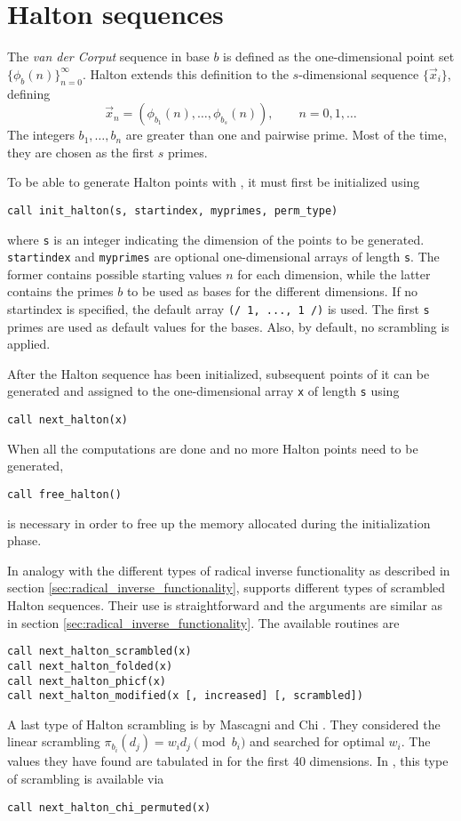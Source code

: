 \section{Halton sequences}

The \emph{van der Corput} sequence in base $b$ is defined as the
one-dimensional point set $\{\phi_b(n)\}_{n=0}^{\infty}$.  Halton
\cite{halton60} extends this definition to the $s$-dimensional sequence
$\{\vec{x}_i\}$, defining
\[
\vec{x}_n = (\phi_{b_1}(n), \dots, \phi_{b_s}(n)), \qquad n = 0, 1, \dots
\]
The integers $b_1, \dots, b_n$ are greater than one and pairwise prime.  Most of the time, they are chosen as the first $s$ primes.

To be able to generate Halton points with \qmcpack{}, it must first be
initialized using
\begin{lstlisting}
call init_halton(s, startindex, myprimes, perm_type)
\end{lstlisting}
where \verb!s! is an integer indicating the dimension of the points to be
generated. \verb!startindex! and \verb!myprimes! are optional one-dimensional
arrays of length \verb!s!.  The former contains possible starting values $n$
for each dimension, while the latter contains the primes $b$ to be used
as bases for the different dimensions.  If no startindex is specified, the
default array \verb!(/ 1, ..., 1 /)! is used.  The first \verb!s! primes are
used as default values for the bases.  Also, by default, no scrambling is
applied.

After the Halton sequence has been initialized, subsequent points of it can be
generated and assigned to the one-dimensional array \verb!x! of length
\verb!s! using
\begin{lstlisting}
call next_halton(x)
\end{lstlisting}

When all the computations are done and no more Halton points need to be
generated,
\begin{lstlisting}
call free_halton()
\end{lstlisting}
is necessary in order to free up the memory allocated during the initialization
phase.

In analogy with the different types of radical inverse functionality as
described in section \ref{sec:radical_inverse_functionality}, \qmcpack{}
supports different types of scrambled Halton sequences.  Their use is
straightforward and the arguments are similar as in section
\ref{sec:radical_inverse_functionality}.  The available routines are
\begin{lstlisting}
call next_halton_scrambled(x)
call next_halton_folded(x)
call next_halton_phicf(x)
call next_halton_modified(x [, increased] [, scrambled])
\end{lstlisting}
A last type of Halton scrambling is by Mascagni and Chi \cite{mascagni04chi}.
They considered the linear scrambling $\pi_{b_i}(d_j)=w_id_j \pmod{b_i}$ and
searched for optimal $w_i$.  The values they have found are tabulated in
\cite{mascagni04chi} for the first 40 dimensions.  In \qmcpack{}, this type of
scrambling is available via
\begin{lstlisting}
call next_halton_chi_permuted(x)
\end{lstlisting}


